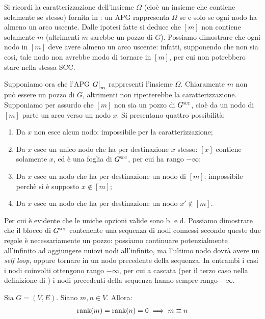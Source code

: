 \begin{proof2}
    Si ricordi la caratterizzazione dell'insieme $\Omega$ (cioè un insieme che contiene solamente se stesso) fornita in \cite{aczel}: un APG rappresenta $\Omega$ se e solo se ogni nodo ha almeno un arco uscente. Dalle ipotesi fatte si deduce che $[m]$ non contiene solamente $m$ (altrimenti $m$ sarebbe un pozzo di $G$). Possiamo dimostrare che ogni nodo in $[m]$ deve avere almeno un arco uscente: infatti, supponendo che non sia così, tale nodo non avrebbe modo di tornare in $[m]$, per cui non potrebbero stare nella stessa SCC.

    Supponiamo ora che l'APG $\restr{G}{m}$ rappresenti l'insieme $\Omega$. Chiaramente $m$ non può essere un pozzo di $G$, altrimenti non ripetterebbe la caratterizzazione. Supponiamo per assurdo che $[m]$ non sia un pozzo di $G^{\superscc}$, cioè da un nodo di $[m]$ parte un arco verso un nodo $x$. Si presentano quattro possibilità:
    \begin{enumerate}
        \item Da $x$ non esce alcun nodo: impossibile per la caratterizzazione;
        \item Da $x$ esce un unico nodo che ha per destinazione $x$ stesso: $[x]$ contiene solamente $x$, ed è una foglia di $G^{\superscc}$, per cui ha rango $-\infty$;
        \item Da $x$ esce un nodo che ha per destinazione un nodo di $[m]$: impossibile perchè si è supposto $x \not\in [m]$;
        \item Da $x$ esce un nodo che ha per destinazione un nodo $x' \not\in [m]$.
    \end{enumerate}
    Per cui è evidente che le uniche opzioni valide sono b. e d. Possiamo dimostrare che il blocco di $G^{\superscc}$ contenente una sequenza di nodi connessi secondo queste due regole è necessariamente un pozzo: possiamo continuare potenzialmente all'infinito ad aggiungere nuiovi nodi all'infinito, ma l'ultimo nodo dovrà avere un \emph{self loop}, oppure tornare in un nodo precedente della sequenza. In entrambi i casi i nodi coinvolti ottengono rango $-\infty$, per cui a cascata (per il terzo caso nella definizione di \rankfunc) i nodi precedenti della sequenza hanno sempre rango $-\infty$.
\end{proof2}
\begin{proposition}
    \label{prop:leaf_rank}
    Sia $G = (V,E)$. Siano $m,n \in V$. Allora:
    \begin{gather*}
        \textup{rank}(m) = \textup{rank}(n) = 0 \implies m \equiv n
    \end{gather*}
\end{proposition}
